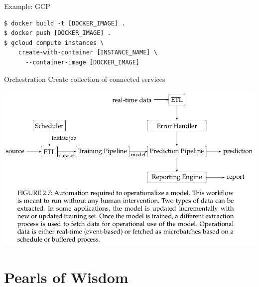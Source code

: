 \documentclass{beamer}
\begin{document}
\begin{frame}[fragile]{Example: GCP}
\begin{lstlisting}[style=custombash]
$ docker build -t [DOCKER_IMAGE] .
$ docker push [DOCKER_IMAGE] .
$ gcloud compute instances \
    create-with-container [INSTANCE_NAME] \
      --container-image [DOCKER_IMAGE]
\end{lstlisting}
\end{frame}


\begin{frame}{Orchestration}
Create collection of connected services

\includegraphics[width=\linewidth]{images/o16n_pipeline}

\end{frame}




\section{Pearls of Wisdom}
\end{document}
